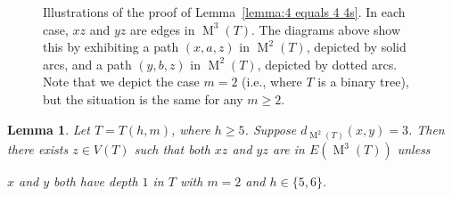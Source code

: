 \documentclass[12pt]{amsart}
\newtheorem{lemma}[theorem]{Lemma}
\theoremstyle{definition}
\theoremstyle{remark}
\numberwithin{equation}{section}
\numberwithin{figure}{section}
\newcommand{\M}{\operatorname{M}}
\begin{document}
\begin{figure}[h!]
    \centering
    \begin{subfigure}[b]{0.3\textwidth}
        \centering
        
        \caption{}
        \label{subfig:lemma73 1}
    \end{subfigure}
        \begin{subfigure}[b]{0.3\textwidth}
        \centering
        
        \caption{}
        \label{subfig:lemma73 2a}
    \end{subfigure}
        \begin{subfigure}[b]{0.3\textwidth}
        \centering
        
        \caption{}
        \label{subfig:lemma73 2b}
    \end{subfigure}
        \begin{subfigure}[b]{0.3\textwidth}
        \centering
        
        \caption{}
        \label{subfig:lemma73 3a}
    \end{subfigure}
        \begin{subfigure}[b]{0.3\textwidth}
        \centering
        
        \caption{}
        \label{subfig:lemma73 3b}
    \end{subfigure}

   
    \caption{Illustrations of the proof of Lemma~\ref{lemma:4 equals 4 4s}.
    In each case, $xz$ and $yz$ are edges in $\M^3(T)$.
    The diagrams above show this by exhibiting a path $(x,a,z)$ in $\M^2(T)$, depicted by solid arcs, and a path $(y,b,z)$ in $\M^2(T)$, depicted by dotted arcs.
    Note that we depict the case $m=2$ (i.e., where $T$ is a binary tree), but the situation is the same for any $m \geq 2$.}
    \label{fig:lemma 4 equals 4 4s}
\end{figure}

\begin{lemma}
    \label{lemma:M3T}
    Let $T = T(h,m)$, where $h \geq 5$.
    Suppose ${d_{\M^2(T)}(x,y) = 3}$. Then there exists $z \in V(T)$ such that both $xz$ and $yz$ are in $E(\M^3(T))$ unless

\begin{center}
$x$ and $y$ both have depth $1$ in $T$ with $m = 2$ and $h \in \{5,6\}$.
\end{center}

        

        
    
\end{lemma}
\end{document}

